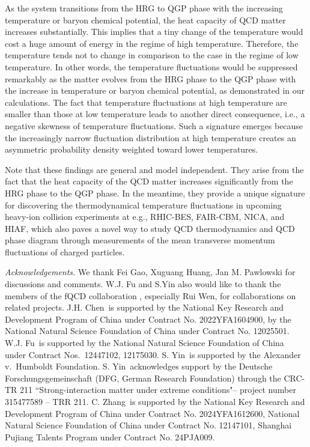 \documentclass[aps,twocolumn,
prl,
superscriptaddress,nofootinbib,floatfix]{revtex4-2}
\begin{document}
As the system transitions from the HRG to QGP phase with the increasing temperature or baryon chemical potential, the heat capacity of QCD matter increases substantially. This implies that a tiny change of the temperature would cost a huge amount of energy in the regime of high temperature. Therefore, the temperature tends not to change in comparison to the case in the regime of low temperature. In other words, the temperature fluctuations would be suppressed remarkably as the matter evolves from the HRG phase to the QGP phase with the increase in temperature or baryon chemical potential, as demonstrated in our calculations. The fact that temperature fluctuations at high temperature are smaller than those at low temperature leads to another direct consequence, i.e., a negative skewness of temperature fluctuations. Such a signature emerges because the increasingly narrow fluctuation distribution at high temperature creates an asymmetric probability density weighted toward lower temperatures. 

Note that these findings are general and model independent. They arise from the fact that the heat capacity of the QCD matter increases significantly from the HRG phase to the QGP phase. In the meantime, they provide a unique signature for discovering the thermodynamical temperature fluctuations in upcoming heavy-ion collision experiments at e.g., RHIC-BES, FAIR-CBM, NICA, and HIAF, which also paves a novel way to study QCD thermodynamics and QCD phase diagram through measurements of the mean transverse momentum fluctuations of charged particles.


\textit{Acknowledgements.} We thank Fei Gao,  Xuguang Huang, Jan M. Pawlowski for discussions and comments. W.J. Fu and S.Yin also would like to thank the members of the fQCD collaboration \cite{fQCD}, especially Rui Wen, for collaborations on related projects.
J.H. Chen\ is supported by the National Key Research and Development Program of China under Contract No. 2022YFA1604900, by the National Natural Science Foundation of China under Contract No. 12025501.
W.J. Fu\ is supported by the National Natural Science Foundation of China under Contract Nos.\ 12447102, 12175030. 
S. Yin\ is supported by the Alexander v.\ Humboldt Foundation. 
S. Yin\ acknowledges support by the Deutsche Forschungsgemeinschaft (DFG, German Research Foundation) through the CRC-TR 211 ``Strong-interaction matter under extreme conditions"– project number 315477589 – TRR 211.
C. Zhang\ is supported by the National Key Research and Development Program of China under Contract No. 2024YFA1612600, National Natural Science Foundation of China under Contract No. 12147101, Shanghai Pujiang Talents Program under Contract No. 24PJA009.

% 

\vfill 
\end{document}
